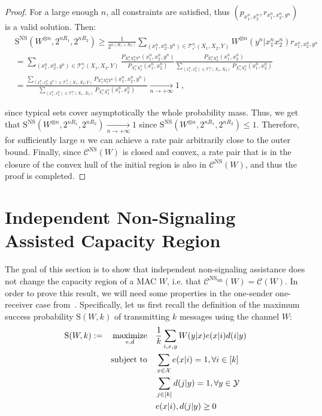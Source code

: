 \begin{proof}
    For a large enough $n$, all constraints are satisfied, thus $(p_{x_1^n,x_2^n},r_{x_1^n,x_2^n,y^n})$ is a valid solution. Then:
    \begin{equation}
      \begin{aligned}
        &\mathrm{S}^{\overline{\mathrm{NS}}}(W^{\otimes n},2^{nR_1},2^{nR_2}) \geq \frac{1}{2^{n(R_1+R_2)}} \sum_{(x_1^n,x_2^n,y^n) \in \mathcal{T}^n_{\varepsilon'}(X_1,X_2,Y)} W^{\otimes n}(y^n|x_1^nx_2^n)r_{x_1^n,x_2^n,y^n}\\
        &= \sum_{(x_1^n,x_2^n,y^n) \in \mathcal{T}^n_{\varepsilon'}(X_1,X_2,Y)} \frac{P_{X_1^nX_2^nY^n}(x_1^n,x_2^n,y^n)}{P_{X_1^nX_2^n}(x_1^n,x_2^n)}\frac{P_{X_1^nX_2^n}(x_1^n,x_2^n)}{\sum_{(x_1^n,x_2^n) \in \mathcal{T}^n_{\varepsilon}(X_1,X_2)}P_{X_1^nX_2^n}(x_1^n,x_2^n)}\\
        &= \frac{\sum_{(x_1^n,x_2^n,y^n) \in \mathcal{T}^n_{\varepsilon'}(X_1,X_2,Y)} P_{X_1^nX_2^nY^n}(x_1^n,x_2^n,y^n)}{\sum_{(x_1^n,x_2^n) \in \mathcal{T}^n_{\varepsilon}(X_1,X_2)}P_{X_1^nX_2^n}(x_1^n,x_2^n) } \underset{n \rightarrow +\infty}{\rightarrow} 1\ ,
      \end{aligned}
    \end{equation}

    since typical sets cover asymptotically the whole probability mass. Thus, we get that $\mathrm{S}^{\overline{\mathrm{NS}}}(W^{\otimes n},2^{nR_1},2^{nR_2}) \underset{n \rightarrow +\infty}{\rightarrow} 1$ since $\mathrm{S}^{\overline{\mathrm{NS}}}(W^{\otimes n},2^{nR_1},2^{nR_2}) \leq 1$. Therefore, for sufficiently large $n$ we can achieve a rate pair arbitrarily close to the outer bound. Finally, since $\mathcal{C}^{\overline{\mathrm{NS}}}(W)$ is closed and convex, a rate pair that is in the closure of the convex hull of the initial region is also in $\mathcal{C}^{\overline{\mathrm{NS}}}(W)$, and thus the proof is completed.
  \end{proof}


  \section{Independent Non-Signaling Assisted Capacity Region}
  \label{section:NSsr}
The goal of this section is to show that independent non-signaling assistance does not change the capacity region of a MAC $W$, i.e. that $\mathcal{C}^{\mathrm{NS}_{\mathrm{SR}}}(W)=\mathcal{C}(W)$. In order to prove this result, we will need some properties in the one-sender one-receiver case from~\cite{BF18}. Specifically, let us first recall the definition of the maximum success probability $\mathrm{S}(W,k)$ of transmitting $k$ messages using the channel $W$:
\begin{equation}
  \begin{aligned}
    \mathrm{S}(W,k) := &&\underset{e,d}{\operatorname{\text{maximize}}} &&& \frac{1}{k} \sum_{i,x,y} W(y|x)e(x|i)d(i|y)\\
    &&\operatorname{\text{subject to}} &&& \sum_{x \in \mathcal{X}} e(x|i) = 1, \forall i \in [k]\\
    &&&&& \sum_{j \in [k]} d(j|y) = 1, \forall y \in \mathcal{Y}\\
    &&&&& e(x|i), d(j|y) \geq 0
  \end{aligned}
\end{equation}

